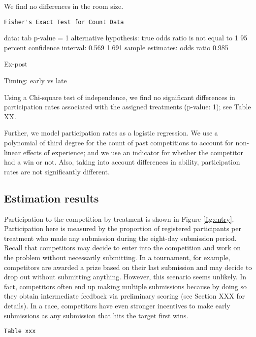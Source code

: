 \documentclass[12pt,]{article}
\begin{document}
We find no differences in the room size.

\begin{verbatim}
Fisher's Exact Test for Count Data
\end{verbatim}

data: tab p-value = 1 alternative hypothesis: true odds ratio is not
equal to 1 95 percent confidence interval: 0.569 1.691 sample estimates:
odds ratio 0.985

Ex-post

Timing: early vs late

Using a Chi-square test of independence, we find no significant
differences in participation rates associated with the assigned
treatments (p-value: 1); see Table XX.

Further, we model participation rates as a logistic regression. We use a
polynomial of third degree for the count of past competitions to account
for non-linear effects of experience; and we use an indicator for
whether the competitor had a win or not. Also, taking into account
differences in ability, participation rates are not significantly
different.

\subsection{Estimation results}\label{estimation-results}

Participation to the competition by treatment is shown in Figure
\ref{fig:entry}. Participation here is measured by the proportion of
registered participants per treatment who made any submission during the
eight-day submission period. Recall that competitors may decide to enter
into the competition and work on the problem without necessarily
submitting. In a tournament, for example, competitors are awarded a
prize based on their last submission and may decide to drop out without
submitting anything. However, this scenario seems unlikely. In fact,
competitors often end up making multiple submissions because by doing so
they obtain intermediate feedback via preliminary scoring (see Section
XXX for details). In a race, competitors have even stronger incentives
to make early submissions as any submission that hits the target first
wins.

\begin{verbatim}
Table xxx
\end{verbatim}
\end{document}
